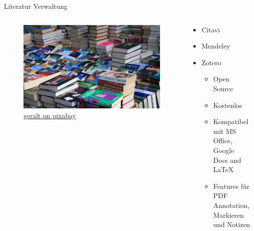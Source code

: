 \begin{frame}{Literatur Verwaltung}
    \begin{columns}[t]
        \begin{column}{0.39\textwidth}      
            \vspace{-2em} 
            \begin{figure}[t]
                \begin{flushleft}
                    \includegraphics[height=0.8\textheight,trim={11cm 0 15cm 0},clip]{graphics/Flohmarkt.jpg}         
                    \caption*{\href{https://pixabay.com/de/photos/flohmarkt-bücher-kiste-stöbern-237460/}{geralt on pixabay}}    
                \end{flushleft}
            \end{figure}
        \end{column}          
        \begin{column}{0.69\textwidth}
            \begin{itemize}
                \item Citavi
                \item Mendeley
                \item Zotero
                \pause
                \begin{itemize}
                    \item Open Source
                    \item Kostenlos
                    \item Kompatibel mit MS Office, Google Docs and LaTeX
                    \item Features für PDF Annotation, Markieren und Notizen
                \end{itemize}
            \end{itemize}           
        \end{column}        
    \end{columns}    
\end{frame}

